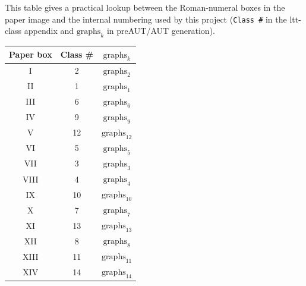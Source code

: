 \documentclass[11pt]{article}
\theoremstyle{definition}
\begin{document}
\noindent This table gives a practical lookup between the Roman-numeral boxes in the paper image and the internal numbering used by this project (\texttt{Class \#} in the ltt-class appendix and \(\mathrm{graphs}_k\) in preAUT/AUT generation).

\begin{center}
\begin{tabular}{c|c|c}
\textbf{Paper box} & \textbf{Class \#} & \textbf{\(\mathrm{graphs}_k\)} \\
\hline
I & 2 & \(\mathrm{graphs}_2\) \\
II & 1 & \(\mathrm{graphs}_1\) \\
III & 6 & \(\mathrm{graphs}_6\) \\
IV & 9 & \(\mathrm{graphs}_9\) \\
V & 12 & \(\mathrm{graphs}_{12}\) \\
VI & 5 & \(\mathrm{graphs}_5\) \\
VII & 3 & \(\mathrm{graphs}_3\) \\
VIII & 4 & \(\mathrm{graphs}_4\) \\
IX & 10 & \(\mathrm{graphs}_{10}\) \\
X & 7 & \(\mathrm{graphs}_7\) \\
XI & 13 & \(\mathrm{graphs}_{13}\) \\
XII & 8 & \(\mathrm{graphs}_8\) \\
XIII & 11 & \(\mathrm{graphs}_{11}\) \\
XIV & 14 & \(\mathrm{graphs}_{14}\) \\
\end{tabular}
\end{center}
\end{document}
